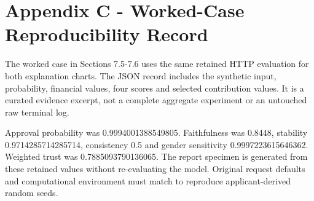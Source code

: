 \documentclass[12pt,a4paper]{report}
\begin{document}
\chapter*{Appendix C - Worked-Case Reproducibility Record}
The worked case in Sections 7.5-7.6 uses the same retained HTTP evaluation for both explanation charts. The JSON record includes the synthetic input, probability, financial values, four scores and selected contribution values. It is a curated evidence excerpt, not a complete aggregate experiment or an untouched raw terminal log.

Approval probability was 0.9994001388549805. Faithfulness was 0.8448, stability 0.9714285714285714, consistency 0.5 and gender sensitivity 0.9997223615646362. Weighted trust was 0.7885093790136065. The report specimen is generated from these retained values without re-evaluating the model. Original request defaults and computational environment must match to reproduce applicant-derived random seeds.
\end{document}
